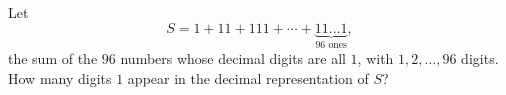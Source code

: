 Let
\[
S=1+11+111+\cdots+\underbrace{11\ldots1}_{96\text{ ones}},
\]
the sum of the $96$ numbers whose decimal digits are all $1$, with $1,2,\dots,96$ digits. How many digits $1$ appear in the decimal representation of $S$?
